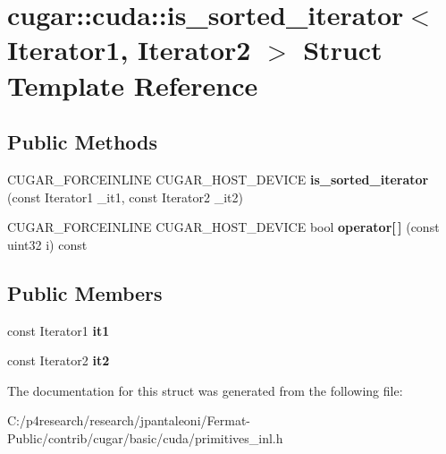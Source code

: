 \hypertarget{structcugar_1_1cuda_1_1is__sorted__iterator}{}\section{cugar\+:\+:cuda\+:\+:is\+\_\+sorted\+\_\+iterator$<$ Iterator1, Iterator2 $>$ Struct Template Reference}
\label{structcugar_1_1cuda_1_1is__sorted__iterator}
\subsection*{Public Methods}
\begin{DoxyCompactItemize}
\item 
\mbox{\label{structcugar_1_1cuda_1_1is__sorted__iterator_a9cc173e751dfec8dd19082514e297681}} 
C\+U\+G\+A\+R\+\_\+\+F\+O\+R\+C\+E\+I\+N\+L\+I\+NE C\+U\+G\+A\+R\+\_\+\+H\+O\+S\+T\+\_\+\+D\+E\+V\+I\+CE {\bfseries is\+\_\+sorted\+\_\+iterator} (const Iterator1 \+\_\+it1, const Iterator2 \+\_\+it2)
\item 
\mbox{\label{structcugar_1_1cuda_1_1is__sorted__iterator_a2559419eb4d81975cad169b795974b11}} 
C\+U\+G\+A\+R\+\_\+\+F\+O\+R\+C\+E\+I\+N\+L\+I\+NE C\+U\+G\+A\+R\+\_\+\+H\+O\+S\+T\+\_\+\+D\+E\+V\+I\+CE bool {\bfseries operator\mbox{[}$\,$\mbox{]}} (const uint32 i) const
\end{DoxyCompactItemize}
\subsection*{Public Members}
\begin{DoxyCompactItemize}
\item 
\mbox{\label{structcugar_1_1cuda_1_1is__sorted__iterator_a186b47fe93b5c513658b6d676496a664}} 
const Iterator1 {\bfseries it1}
\item 
\mbox{\label{structcugar_1_1cuda_1_1is__sorted__iterator_afb5d3f2ab5e2d167e144a776dacbd4fa}} 
const Iterator2 {\bfseries it2}
\end{DoxyCompactItemize}


The documentation for this struct was generated from the following file\+:\begin{DoxyCompactItemize}
\item 
C\+:/p4research/research/jpantaleoni/\+Fermat-\/\+Public/contrib/cugar/basic/cuda/primitives\+\_\+inl.\+h\end{DoxyCompactItemize}

